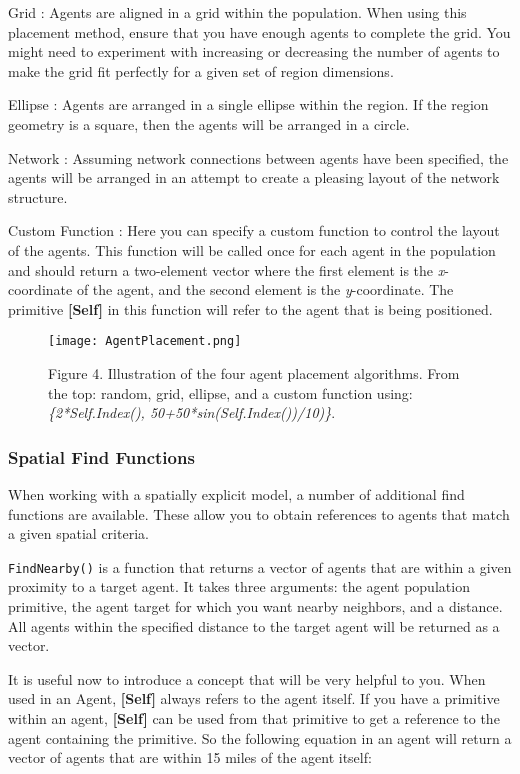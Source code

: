 \documentclass[]{memoir}
\let\Oldincludegraphics\includegraphics
\renewcommand{\includegraphics}[1]{\Oldincludegraphics[max size={\textwidth}{\textheight}]{#1}}
\newcommand{\p}[1]{\textbf{{[}#1{]}}}
\begin{document}
Grid : Agents are aligned in a grid within the population. When using
this placement method, ensure that you have enough agents to complete
the grid. You might need to experiment with increasing or decreasing the
number of agents to make the grid fit perfectly for a given set of
region dimensions.

Ellipse : Agents are arranged in a single ellipse within the region. If
the region geometry is a square, then the agents will be arranged in a
circle.

Network : Assuming network connections between agents have been
specified, the agents will be arranged in an attempt to create a
pleasing layout of the network structure.

Custom Function : Here you can specify a custom function to control the
layout of the agents. This function will be called once for each agent
in the population and should return a two-element vector where the first
element is the \emph{x}-coordinate of the agent, and the second element
is the \emph{y}-coordinate. The primitive \p{Self} in this function will
refer to the agent that is being positioned.

\begin{figure}[htbp]
\centering
\texttt{[image: AgentPlacement.png]}
\caption{Figure 4. Illustration of the four agent placement algorithms.
From the top: random, grid, ellipse, and a custom function using:
\emph{\{2*Self.Index(), 50+50*sin(Self.Index())/10)\}}.}
\end{figure}

\subsubsection{Spatial Find Functions}

When working with a spatially explicit model, a number of additional
find functions are available. These allow you to obtain references to
agents that match a given spatial criteria.

\lstinline!FindNearby()! is a function that returns a vector of agents
that are within a given proximity to a target agent. It takes three
arguments: the agent population primitive, the agent target for which
you want nearby neighbors, and a distance. All agents within the
specified distance to the target agent will be returned as a vector.

It is useful now to introduce a concept that will be very helpful to
you. When used in an Agent, \p{Self} always refers to the agent itself.
If you have a primitive within an agent, \p{Self} can be used from that
primitive to get a reference to the agent containing the primitive. So
the following equation in an agent will return a vector of agents that
are within 15 miles of the agent itself:
\end{document}
